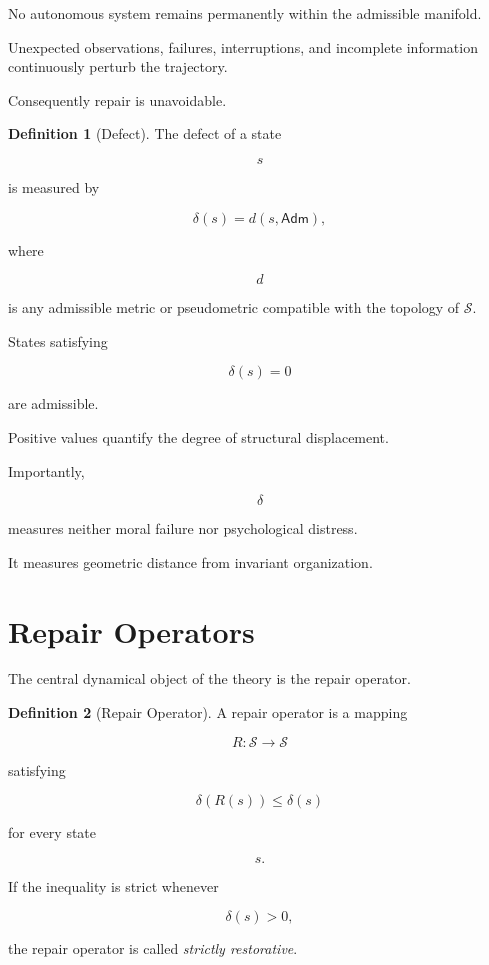 \documentclass[11pt,oneside]{book}
\numberwithin{equation}{chapter}
\theoremstyle{definition}
\newtheorem{definition}{Definition}[chapter]
\theoremstyle{plain}
\begin{document}
No autonomous system remains permanently within the admissible manifold.

Unexpected observations, failures, interruptions, and incomplete information
continuously perturb the trajectory.

Consequently repair is unavoidable.

\begin{definition}[Defect]

The defect of a state

\[
s
\]

is measured by

\[
\delta(s)
=
d
\left(
s,
\mathsf{Adm}
\right),
\]

where

\[
d
\]

is any admissible metric or pseudometric compatible with the topology of
$\mathcal{S}$.

\end{definition}

States satisfying

\[
\delta(s)=0
\]

are admissible.

Positive values quantify the degree of structural displacement.

Importantly,

\[
\delta
\]

measures neither moral failure nor psychological distress.

It measures geometric distance from invariant organization.

\section{Repair Operators}

The central dynamical object of the theory is the repair operator.

\begin{definition}[Repair Operator]

A repair operator is a mapping

\[
R:
\mathcal{S}
\rightarrow
\mathcal{S}
\]

satisfying

\[
\delta(R(s))
\le
\delta(s)
\]

for every state

\[
s.
\]

If the inequality is strict whenever

\[
\delta(s)>0,
\]

the repair operator is called
\emph{strictly restorative}.

\end{definition}
\end{document}
